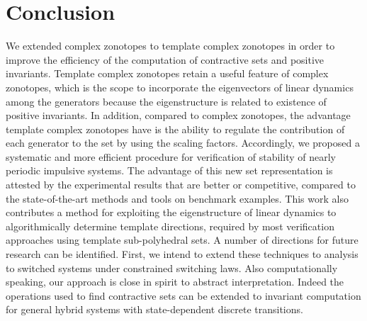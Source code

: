 \vspace{-2em}
\section{Conclusion}
We extended complex zonotopes to template complex
zonotopes in order to improve the efficiency of the computation of
contractive sets and positive invariants.  Template complex zonotopes
retain a useful feature of complex zonotopes, which is the scope to
incorporate the eigenvectors of linear dynamics among the generators
because the eigenstructure is related to existence of positive
invariants.  In addition, compared to complex zonotopes, the advantage
template complex zonotopes have is the ability to regulate the
contribution of each generator to the set by using the scaling
factors.  Accordingly, we proposed a systematic and more efficient
procedure for verification of stability of nearly periodic impulsive
systems.  The advantage of this new set representation is attested by
the experimental results that are better or competitive, compared to
the state-of-the-art methods and tools on benchmark examples. This
work also contributes a method for exploiting the eigenstructure of
linear dynamics to algorithmically determine template directions,
required by most verification approaches using template sub-polyhedral
sets. A number of directions for future research can be
identified. First, we intend to extend these techniques to analysis to
switched systems under constrained switching laws. Also
computationally speaking, our approach is close in spirit to abstract
interpretation. Indeed the operations used to find contractive sets
can be extended to invariant computation for general hybrid
systems with state-dependent discrete transitions.

